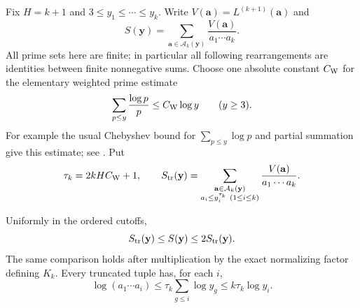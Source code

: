 Fix $H=k+1$ and $3\leq y_1\leq\cdots\leq y_k$. Write
$V(\mathbf a)=L^{(k+1)}(\mathbf a)$ and
\[
 S(\mathbf y)=\sum_{\mathbf a\in\mathcal A_k(\mathbf y)}
             \frac{V(\mathbf a)}{a_1\cdots a_k}.
\]
All prime sets here are finite; in particular all following rearrangements
are identities between finite nonnegative sums. Choose one absolute
constant $C_{\rm W}$ for the elementary weighted prime estimate
\begin{equation}
 \sum_{p\leq y}\frac{\log p}{p}\leq C_{\rm W}\log y
 \qquad(y\geq3).
 \label{artrunc:weighted-primes}
\end{equation}
For example the usual Chebyshev bound for $\sum_{p\leq y}\log p$ and
partial summation give this estimate; see \cite{RosserSchoenfeld1962}. Put
\[
 \tau_k=2kH C_{\rm W}+1,
 \qquad
 S_{\rm tr}(\mathbf y)=
 \sum_{\substack{\mathbf a\in\mathcal A_k(\mathbf y)\\
                         a_i\leq y_i^{\tau_k}\ (1\leq i\leq k)}}
                \frac{V(\mathbf a)}{a_1\cdots a_k}.
\]

\begin{lemma}
\label{artrunc:lemma}
Uniformly in the ordered cutoffs,
\begin{equation}
 S_{\rm tr}(\mathbf y)\leq S(\mathbf y)
                   \leq2 S_{\rm tr}(\mathbf y).
 \label{artrunc:comparison}
\end{equation}
The same comparison holds after multiplication by the exact normalizing
factor defining $K_k$. Every truncated tuple has, for each $i$,
\begin{equation}
 \log(a_1\cdots a_i)
       \leq\tau_k\sum_{g\leq i}\log y_g
       \leq k\tau_k\log y_i.
 \label{artrunc:prefix-size}
\end{equation}
\end{lemma}

